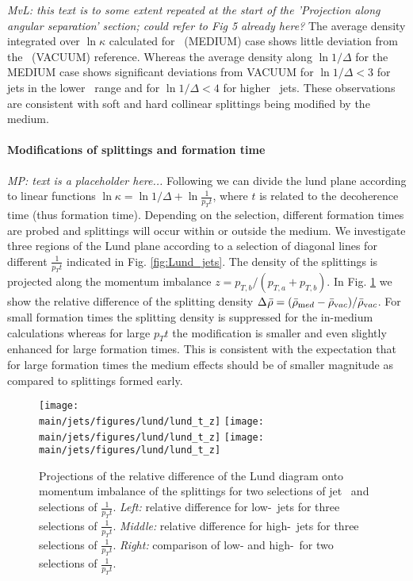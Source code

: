 \textit{MvL: this text is to some extent repeated at the start of the 'Projection along angular separation' section; could refer to Fig 5 already here?}
The average density integrated over $\ln \kappa$ calculated for \PbPb\ (MEDIUM) case shows little deviation from the \pp\ (VACUUM) reference.
Whereas the average density along $\ln 1/\Delta$ for the MEDIUM case shows significant deviations from VACUUM for $\ln 1/\Delta < 3$ for jets in the lower \pt\ range and for $\ln 1/\Delta < 4$ for higher \pt\ jets.
These observations are consistent with soft and hard collinear splittings being modified by the medium.

\paragraph{Modifications of splittings and formation time}

{\it MP: text is a placeholder here...}
Following \cite{Andrews:2018jcm} we can divide the lund plane according to linear functions $\ln\kappa = \ln1/\Delta + \ln \frac{1}{p_{T} t}$, where $t$ is related to the decoherence time (thus formation time).
Depending on the selection, different formation times are probed and splittings will occur within or outside the medium.
We investigate three regions of the Lund plane according to a selection of diagonal lines for different $\frac{1}{p_{T} t}$ indicated in Fig. \ref{fig:Lund_jets}.
The density of the splittings is projected along the momentum imbalance $z = p_{T,b}/(p_{T,a} + p_{T,b})$.
In Fig. \ref{fig:Lund_projections_z} we show the relative difference of the splitting density $\Delta_{\rm}\bar{\rho} = (\bar{\rho}_{\mathrm med} - \bar{\rho}_{\mathrm vac})/\bar{\rho}_{\mathrm vac}$.
For small formation times the splitting density is suppressed for the in-medium calculations whereas for large $p_{T} t$ the modification is smaller and even slightly enhanced for large formation times.
This is consistent with the expectation that for large formation times the medium effects should be of smaller magnitude as compared to splittings formed early.



\begin{figure}[htbp]
	\centering
	\texttt{[image: \\main/jets/figures/lund/lund\_t\_z]}
	\texttt{[image: \\main/jets/figures/lund/lund\_t\_z]}
	\texttt{[image: \\main/jets/figures/lund/lund\_t\_z]}
	\caption{Projections of the relative difference of the Lund diagram onto momentum imbalance of the splittings for two selections of jet \pt\ and selections of $\frac{1}{p_{T} t}$.
	{\it Left:} relative difference for low-\pt\ jets for three selections of $\frac{1}{p_{T} t}$.
	{\it Middle:} relative difference for high-\pt\ jets for three selections of $\frac{1}{p_{T} t}$.
	{\it Right:} comparison of low- and high-\pt\ for two selections of $\frac{1}{p_{T} t}$.
	}
	\label{fig:Lund_projections_z}
\end{figure}

